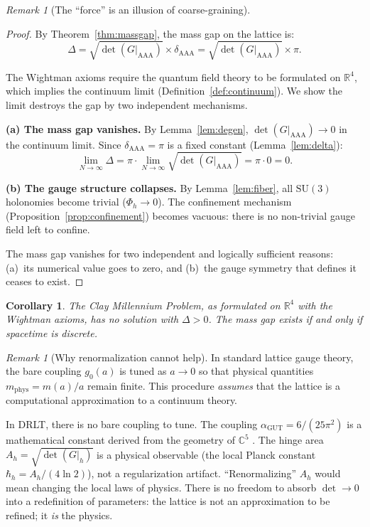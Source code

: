 \documentclass[12pt]{article}
\newtheorem{corollary}[theorem]{Corollary}
\theoremstyle{remark}
\newtheorem{remark}[theorem]{Remark}
\theoremstyle{definition}
\newcommand{\CC}{\mathbb{C}}
\newcommand{\RR}{\mathbb{R}}
\newcommand{\agut}{\alpha_{\mathrm{GUT}}}
\begin{document}
\begin{remark}[The ``force'' is an illusion of coarse-graining]
\begin{proof}
By Theorem~\ref{thm:massgap}, the mass gap on the lattice is:
\begin{equation}
\Delta = \sqrt{\det(G|_{\mathrm{AAA}})} \times \delta_{\mathrm{AAA}}
= \sqrt{\det(G|_{\mathrm{AAA}})} \times \pi.
\end{equation}

The Wightman axioms require the quantum field theory to be formulated on
$\RR^4$, which implies the continuum limit
(Definition~\ref{def:continuum}).  We show the limit destroys the gap
by two independent mechanisms.

\medskip\noindent
\textbf{(a) The mass gap vanishes.}
By Lemma~\ref{lem:degen}, $\det(G|_{\mathrm{AAA}}) \to 0$ in the
continuum limit.  Since $\delta_{\mathrm{AAA}} = \pi$ is a fixed
constant (Lemma~\ref{lem:delta}):
\begin{equation}
\lim_{N \to \infty} \Delta
= \pi \cdot \lim_{N \to \infty} \sqrt{\det(G|_{\mathrm{AAA}})}
= \pi \cdot 0 = 0.
\end{equation}

\medskip\noindent
\textbf{(b) The gauge structure collapses.}
By Lemma~\ref{lem:fiber}, all $\mathrm{SU}(3)$ holonomies become
trivial ($\Phi_h \to 0$).  The confinement mechanism
(Proposition~\ref{prop:confinement}) becomes vacuous: there is no
non-trivial gauge field left to confine.

\medskip\noindent
The mass gap vanishes for two independent and logically sufficient
reasons: (a)~its numerical value goes to zero, and (b)~the gauge
symmetry that defines it ceases to exist.
\end{proof}

\begin{corollary}
The Clay Millennium Problem, as formulated on $\RR^4$ with the
Wightman axioms, has no solution with $\Delta > 0$. The mass gap exists
if and only if spacetime is discrete.
\end{corollary}

\begin{remark}[Why renormalization cannot help]
In standard lattice gauge theory, the bare coupling $g_0(a)$ is tuned as
$a \to 0$ so that physical quantities $m_{\mathrm{phys}} = m(a)/a$
remain finite. This procedure \emph{assumes} that the lattice is a
computational approximation to a continuum theory.

In DRLT, there is no bare coupling to tune. The coupling
$\agut = 6/(25\pi^2)$ is a mathematical constant
derived from the geometry of $\CC^5$ . The hinge
area $A_h = \sqrt{\det(G|_h)}$ is a physical observable (the local
Planck constant $\hbar_h = A_h/(4\ln 2)$), not a regularization
artifact. ``Renormalizing'' $A_h$ would mean changing the local laws of
physics. There is no freedom to absorb $\det \to 0$ into a redefinition
of parameters: the lattice is not an approximation to be refined; it
\emph{is} the physics.
\end{remark}


\end{remark}
\end{document}
